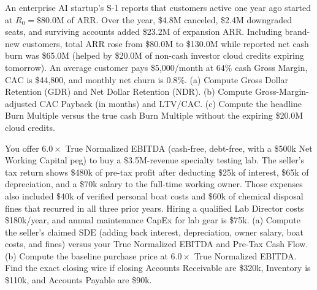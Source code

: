 \begin{exercise}
An enterprise AI startup's S-1 reports that customers active one year ago started at $R_0 = \$80.0\text{M}$ of ARR. Over the year, \$4.8M canceled, \$2.4M downgraded seats, and surviving accounts added \$23.2M of expansion ARR. Including brand-new customers, total ARR rose from \$80.0M to \$130.0M while reported net cash burn was \$65.0M (helped by \$20.0M of non-cash investor cloud credits expiring tomorrow). An average customer pays \$5,000/month at $64\%$ cash Gross Margin, $\text{CAC}$ is \$44,800, and monthly net churn is $0.8\%$.
(a) Compute Gross Dollar Retention ($\text{GDR}$) and Net Dollar Retention ($\text{NDR}$).
(b) Compute Gross-Margin-adjusted CAC Payback (in months) and $\text{LTV} / \text{CAC}$.
(c) Compute the headline Burn Multiple versus the true cash Burn Multiple without the expiring \$20.0M cloud credits.
\end{exercise}

\begin{exercise}
You offer $6.0\times$ True Normalized EBITDA (cash-free, debt-free, with a \$500k Net Working Capital peg) to buy a \$3.5M-revenue specialty testing lab. The seller's tax return shows \$480k of pre-tax profit after deducting \$25k of interest, \$65k of depreciation, and a \$70k salary to the full-time working owner. Those expenses also included \$40k of verified personal boat costs and \$60k of chemical disposal fines that recurred in all three prior years. Hiring a qualified Lab Director costs \$180k/year, and annual maintenance CapEx for lab gear is \$75k.
(a) Compute the seller's claimed $\text{SDE}$ (adding back interest, depreciation, owner salary, boat costs, and fines) versus your True Normalized EBITDA and Pre-Tax Cash Flow.
(b) Compute the baseline purchase price at $6.0\times$ True Normalized EBITDA. Find the exact closing wire if closing Accounts Receivable are \$320k, Inventory is \$110k, and Accounts Payable are \$90k.
\end{exercise}
